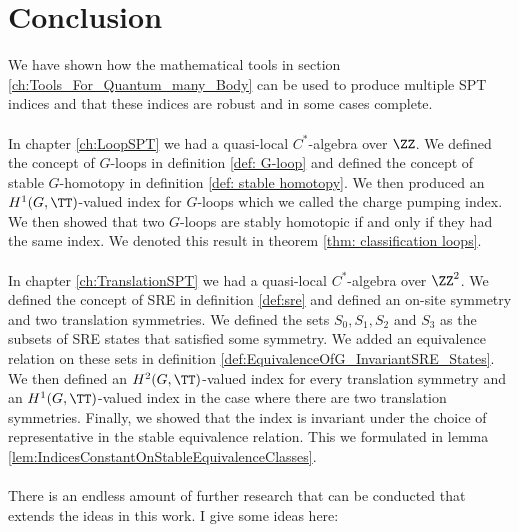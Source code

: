 \chapter{Conclusion}\label{ch:conclusion}

We have shown how the mathematical tools in section \ref{ch:Tools_For_Quantum_many_Body} can be used to produce multiple SPT indices and that these indices are robust and in some cases complete.
\\\\
In chapter \ref{ch:LoopSPT} we had a quasi-local $C^*$-algebra over $\ZZ$. We defined the concept of $G$-loops in definition \ref{def: G-loop} and defined the concept of stable $G$-homotopy in definition \ref{def: stable homotopy}. We then produced an $H^1(G,\TT)$-valued index for $G$-loops which we called the charge pumping index. We then showed that two $G$-loops are stably homotopic if and only if they had the same index. We denoted this result in theorem \ref{thm: classification loops}.
\\\\
In chapter \ref{ch:TranslationSPT} we had a quasi-local $C^*$-algebra over $\ZZ^2$. We defined the concept of SRE in definition \ref{def:sre} and defined an on-site symmetry and two translation symmetries. We defined the sets $S_0,S_1,S_2$ and $S_3$ as the subsets of SRE states that satisfied some symmetry. We added an equivalence relation on these sets in definition \ref{def:EquivalenceOfG_InvariantSRE_States}. We then defined an $H^2(G,\TT)$-valued index for every translation symmetry and an $H^1(G,\TT)$-valued index in the case where there are two translation symmetries. Finally, we showed that the index is invariant under the choice of representative in the stable equivalence relation. This we formulated in lemma \ref{lem:IndicesConstantOnStableEquivalenceClasses}.
\\\\
There is an endless amount of further research that can be conducted that extends the ideas in this work. I give some ideas here:
